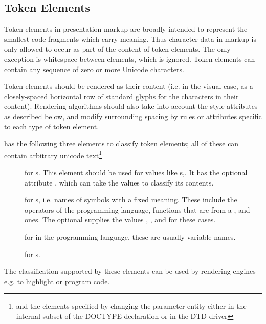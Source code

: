 \subsection{Token Elements}\label{sec:pres:token}

Token elements in presentation markup are broadly intended to represent the
smallest code fragments which carry meaning. Thus character data in {\codeml}
markup is only allowed to occur as part of the content of token elements. The only
exception is whitespace between elements, which is ignored. Token elements can
contain any sequence of zero or more Unicode characters.

Token elements should be rendered as their content (i.e. in the visual case, as a
closely-spaced horizontal row of standard glyphs for the characters in their
content). Rendering algorithms should also take into account the style attributes
as described below, and modify surrounding spacing by rules or attributes specific
to each type of token element.

{\codeml} has the following three elements to classify token elements; all of
these can contain arbitrary unicode text\footnote{and the {\xml} elements
  specified by changing the {} parameter entity either
  in the internal subset of the DOCTYPE declaration or in the DTD driver}
\begin{description}
\item[] for {s}. This
  element should be used for values like {s},. It has the optional attribute {},
  which can take the values {} to
  classify its contents.
\item[] for {s}, i.e. names of symbols with a fixed
  meaning. These include the {}
  operators of the programming language, functions that are
  {} from a {}, and
  {} ones.  The optional
  {} supplies the values {},
  {}, and {} for these
  cases.
\item[] for {} in the programming language,
  these are usually variable names.
\item[] for {s}.
\end{description}
The classification supported by these elements can be used by rendering engines
e.g. to highlight or
{} program code.

